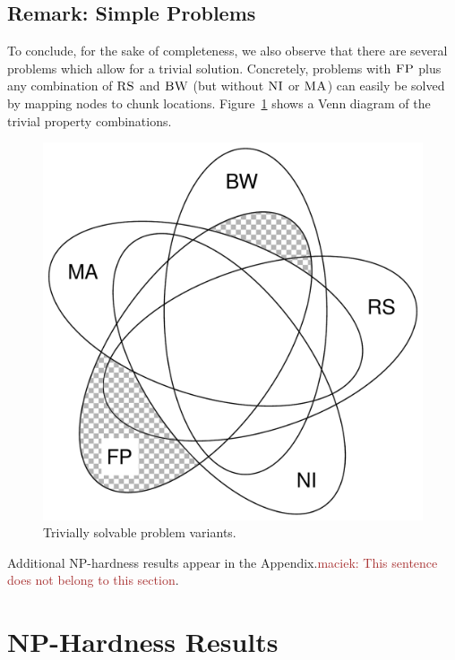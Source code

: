 \documentclass[9pt]{sigcomm-alternate}
\newcommand{\carlo}[1]{\textcolor{red}{carlo: #1}}
\newcommand{\maciek}[1]{\textcolor{brown}{maciek: #1}}
\newcommand{\CC}{\textsc{NI}}
\newcommand{\FP}{\textsc{FP}}
\newcommand{\RS}{\textsc{RS}}
\newcommand{\BW}{\textsc{BW}}
\newcommand{\MA}{\textsc{MA}}
\begin{document}

\subsection{Remark: Simple Problems}

To conclude, for the sake of completeness, we also observe that there are
several problems which
allow for a trivial solution. Concretely, problems with $\FP$
plus any combination of
$\RS$ and $\BW$ (but without $\CC$ or $\MA$) can easily be solved by mapping nodes to chunk locations.
Figure~\ref{fig:venn_trivial}
shows a Venn diagram of the trivial property combinations.

\begin{figure}
\includegraphics[width=0.48\columnwidth]{figs/venn_trivial.pdf}
\caption{Trivially solvable problem variants.}
\label{fig:venn_trivial}
\end{figure}

Additional NP-hardness results appear in the Appendix.\maciek{This sentence does not belong to this section}.

\section{NP-Hardness Results}\label{sec:np}

\end{document}
